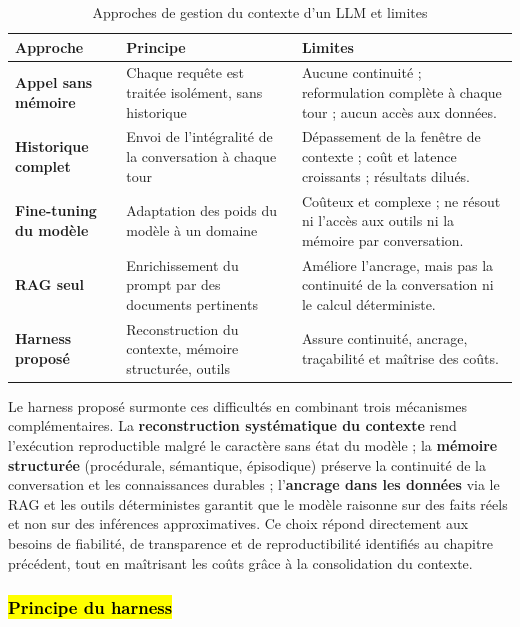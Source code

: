 \begin{table}[H]
\centering
\caption{Approches de gestion du contexte d'un LLM et limites}
\label{tab:approches-contexte}
\small
\begin{tabularx}{\textwidth}{>{\bfseries}p{3.4cm}Y>{\raggedright\arraybackslash}p{4.2cm}}
\toprule
{}
\color{white}Approche & \color{white}Principe & \color{white}Limites \\
\midrule
Appel sans mémoire & Chaque requête est traitée isolément, sans historique & Aucune continuité ; reformulation complète à chaque tour ; aucun accès aux données. \\
\midrule
Historique complet & Envoi de l'intégralité de la conversation à chaque tour & Dépassement de la fenêtre de contexte ; coût et latence croissants ; résultats dilués. \\
\midrule
Fine-tuning du modèle & Adaptation des poids du modèle à un domaine & Coûteux et complexe ; ne résout ni l'accès aux outils ni la mémoire par conversation. \\
\midrule
RAG seul & Enrichissement du prompt par des documents pertinents & Améliore l'ancrage, mais pas la continuité de la conversation ni le calcul déterministe. \\
\midrule
\textbf{Harness proposé} & Reconstruction du contexte, mémoire structurée, outils & Assure continuité, ancrage, traçabilité et maîtrise des coûts. \\
\bottomrule
\end{tabularx}
\end{table}

Le harness proposé surmonte ces difficultés en combinant trois mécanismes complémentaires. La \textbf{reconstruction systématique du contexte} rend l'exécution reproductible malgré le caractère sans état du modèle ; la \textbf{mémoire structurée} (procédurale, sémantique, épisodique) préserve la continuité de la conversation et les connaissances durables ; l'\textbf{ancrage dans les données} via le RAG et les outils déterministes garantit que le modèle raisonne sur des faits réels et non sur des inférences approximatives. Ce choix répond directement aux besoins de fiabilité, de transparence et de reproductibilité identifiés au chapitre précédent, tout en maîtrisant les coûts grâce à la consolidation du contexte.

\subsubsection{\hl{Principe du harness}}

